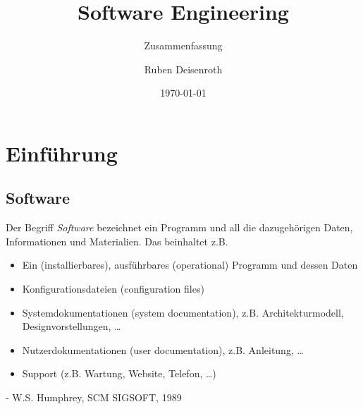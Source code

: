 \documentclass[
    ngerman,
    color=3b,
    summary,
    boxarc,
    main,
]{rubos-tuda-template}
\title[SE]{Software Engineering}
\subtitle{Zusammenfassung}
\author{Ruben Deisenroth}
\date{\today}
\begin{document}
\maketitle{}
\tableofcontents %

\clearpage
\section{Einführung}
\subsection{Software}
\begin{definition}[Software]
    Der Begriff \textit{Software} bezeichnet ein Programm und all die dazugehörigen Daten, Informationen und Materialien. Das beinhaltet z.B.\begin{itemize}
        \item Ein (installierbares), ausführbares (operational) Programm und dessen Daten
        \item Konfigurationsdateien (configuration files)
        \item Systemdokumentationen (system documentation), z.B. Architekturmodell, Designvorstellungen, \dots
        \item Nutzerdokumentationen (user documentation), z.B. Anleitung, \dots
        \item Support (z.B. Wartung, Website, Telefon, \dots)
    \end{itemize}
    \hfill - W.S. Humphrey, SCM SIGSOFT, 1989
\end{definition}
\end{document}
